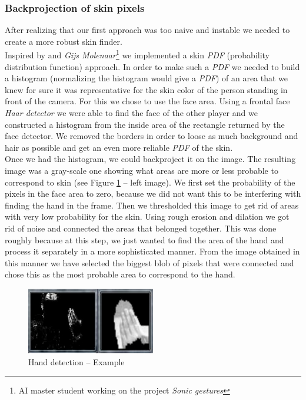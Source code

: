 \documentclass[a4paper, 11pt, twocolumn]{article}
\begin{document}
		\subsubsection{Backprojection of skin pixels}
       	After realizing that our first approach was too naive and instable we needed to create a more robust skin finder.\\
       \hspace*{10px} Inspired by \cite{IMS} and \emph{Gijs Molenaar}\footnote[1]{AI master student working on the project \emph{Sonic gestures}} we implemented a skin \emph{PDF} (probability distribution function) approach. In order to make such a \emph{PDF} we needed to build a histogram (normalizing the histogram would give a \emph{PDF}) of an area that we knew for sure it was representative for the skin color of the person standing in front of the camera. For this we chose to use the face area. Using a frontal face \emph{Haar detector} we were able to find the face of the other player and we constructed a histogram from the inside area of the rectangle returned by the face detector. We removed the borders in order to loose as much background and hair as possible and get an even more reliable \emph{PDF} of the skin.\\
       \hspace*{10px} Once we had the histogram, we could backproject it on the image. The resulting image was a gray-scale one showing what areas are more or less probable to correspond to skin (see Figure \ref{img:skinProb} -- left image). We first set the probability of the pixels in the face area to zero, because we did not want this to be interfering with finding the hand in the frame. Then we thresholded this image to get rid of areas with very low probability for the skin. Using rough erosion and dilation we got rid of noise and connected the areas that belonged together. This was done roughly because at this step, we just wanted to find the area of the hand and process it separately in a more sophisticated manner. From the image obtained in this manner we have selected the biggest blob of pixels that were connected and chose this as the most probable area to correspond to the hand.\\
		\begin{figure}[!hbtp]
		   \centering
		   \includegraphics[width=0.5\textwidth]{hands.png}
			\caption{Hand detection -- Example}
			\label{img:skinProb}
	   	\end{figure}	
\end{document}
